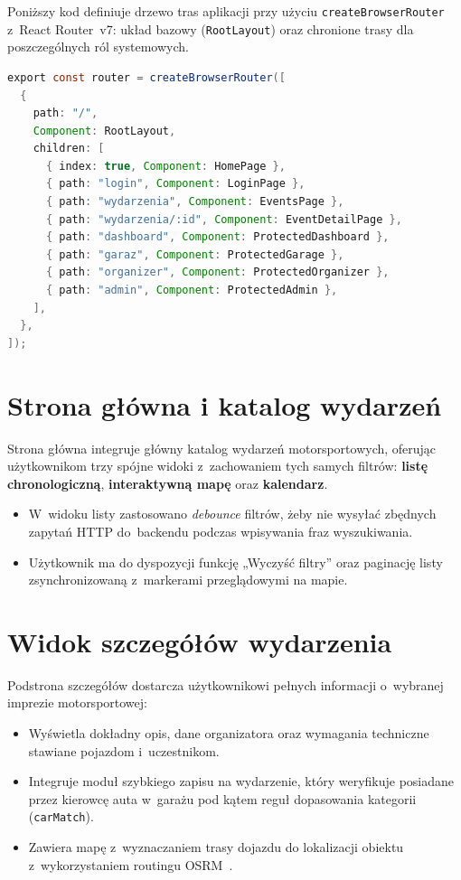 \documentclass{sprz}
\begin{document}
Poniższy kod definiuje drzewo tras aplikacji przy użyciu \texttt{createBrowserRouter} z~React Router~v7: układ bazowy (\texttt{RootLayout}) oraz chronione trasy dla poszczególnych ról systemowych.

\begin{lstlisting}[language=Java,caption={Fragment drzewa tras React Router (katalog, auth, panele) --- warstwa webowa.},label={lst:ch11-routes}]
export const router = createBrowserRouter([
  {
    path: "/",
    Component: RootLayout,
    children: [
      { index: true, Component: HomePage },
      { path: "login", Component: LoginPage },
      { path: "wydarzenia", Component: EventsPage },
      { path: "wydarzenia/:id", Component: EventDetailPage },
      { path: "dashboard", Component: ProtectedDashboard },
      { path: "garaz", Component: ProtectedGarage },
      { path: "organizer", Component: ProtectedOrganizer },
      { path: "admin", Component: ProtectedAdmin },
    ],
  },
]);
\end{lstlisting}

\section{Strona główna i katalog wydarzeń}
Strona główna integruje główny katalog wydarzeń motorsportowych, oferując użytkownikom trzy spójne widoki z~zachowaniem tych samych filtrów: \textbf{listę chronologiczną}, \textbf{interaktywną mapę} oraz \textbf{kalendarz}.
\begin{itemize}
  \item W~widoku listy zastosowano \emph{debounce} filtrów, żeby nie wysyłać zbędnych zapytań HTTP do~backendu podczas wpisywania fraz wyszukiwania.
  \item Użytkownik ma do dyspozycji funkcję „Wyczyść filtry” oraz paginację listy zsynchronizowaną z~markerami przeglądowymi na mapie.
\end{itemize}

\section{Widok szczegółów wydarzenia}
Podstrona szczegółów dostarcza użytkownikowi pełnych informacji o~wybranej imprezie motorsportowej:
\begin{itemize}
  \item Wyświetla dokładny opis, dane organizatora oraz wymagania techniczne stawiane pojazdom i~uczestnikom.
  \item Integruje moduł szybkiego zapisu na wydarzenie, który weryfikuje posiadane przez kierowcę auta w~garażu pod kątem reguł dopasowania kategorii (\texttt{carMatch}).
  \item Zawiera mapę z~wyznaczaniem trasy dojazdu do lokalizacji obiektu z~wykorzystaniem routingu OSRM~\cite{osrm:project}.
\end{itemize}
\end{document}
